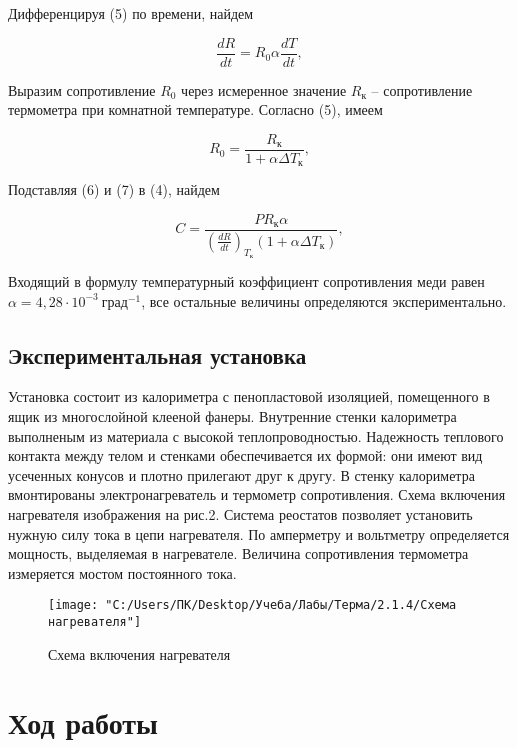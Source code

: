 \documentclass[12pt,a4paper]{article}
\begin{document}
Дифференцируя (5) по времени, найдем

\begin{equation}
    \frac{dR}{dt} = R_{0}\alpha \frac{dT}{dt},
    \label{dRT}
\end{equation}

Выразим сопротивление $R_{0}$ через исмеренное значение $R_{\text{к}}$ -- сопротивление термометра при комнатной температуре. Согласно (5), имеем

\begin{equation}
    R_{0} = \frac{R_{\text{к}}}{1 + \alpha \Delta T_{\text{к}}},
    \label{R0}
\end{equation}

Подставляя (6) и (7) в (4), найдем

\begin{equation}
    C = \frac{PR_{\text{к}} \alpha}{(\frac{dR}{dt})_{T_{\text{к}}}(1 + \alpha \Delta T_{\text{к}})},
    \label{capacity}
\end{equation}
 
 Входящий в формулу температурный коэффициент сопротивления меди равен $\alpha = 4,28 \cdot 10^{-3}~\text{град}^{-1}$, все остальные величины определяются экспериментально. 
 
\subsection*{Экспериментальная установка}

Установка состоит из калориметра с пенопластовой изоляцией, помещенного в ящик из многослойной клееной фанеры. Внутренние стенки калориметра выполненым из материала с высокой теплопроводностью. Надежность теплового контакта между телом и стенками обеспечивается их формой: они имеют вид усеченных конусов и плотно прилегают друг к другу. В стенку калориметра вмонтированы электронагреватель и термометр сопротивления. Схема включения нагревателя изображения на рис.2. Система реостатов позволяет установить нужную силу тока в цепи нагревателя. По амперметру и вольтметру определяется мощность, выделяемая в нагревателе. Величина сопротивления термометра измеряется мостом постоянного тока.

\begin{figure}[!h]
	\centering
	\texttt{[image: "C:/Users/ПК/Desktop/Учеба/Лабы/Терма/2.1.4/Схема нагревателя"]}
	\caption{Схема включения нагревателя}
	\label{fig:boiler}
\end{figure}
 
\section{Ход работы}
\end{document}
